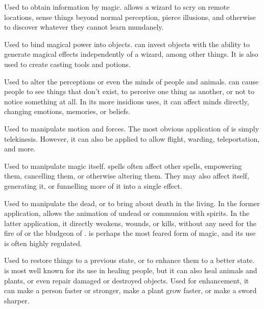 
Used to obtain information by magic.
 allows a wizard to scry on remote locations, sense things beyond normal perception, pierce illusions, and otherwise to discover whatever they cannot learn mundanely.


Used to bind magical power into objects.
 can invest objects with the ability to generate magical effects independently of a wizard, among other things.
It is also used to create casting tools and potions.


Used to alter the perceptions or even the minds of people and animals.
 can cause people to see things that don't exist, to perceive one thing as another, or not to notice something at all.
In its more insidious uses, it can affect minds directly, changing emotions, memories, or beliefs.


Used to manipulate motion and forces.
The most obvious application of  is simply telekinesis.
However, it can also be applied to allow flight, warding, teleportation, and more.


Used to manipulate magic itself.
 spells often affect other spells, empowering them, cancelling them, or otherwise altering them.
They may also affect {\mana} itself, generating it, or funnelling more of it into a single effect.


Used to manipulate the dead, or to bring about death in the living.
In the former application,  allows the animation of undead or communion with spirits.
In the latter application, it directly weakens, wounds, or kills, without any need for the fire of  or the bludgeon of .
 is perhaps the most feared form of magic, and its use is often highly regulated.


Used to restore things to a previous state, or to enhance them to a better state.
 is most well known for its use in healing people, but it can also heal animals and plants, or even repair damaged or destroyed objects.
Used for enhancement, it can make a person faster or stronger, make a plant grow faster, or make a sword sharper.

